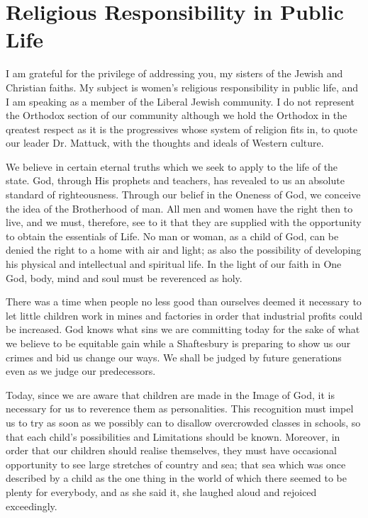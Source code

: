 \chapter{Religious Responsibility in Public Life}

I am grateful for the privilege of addressing you, my
sisters of the Jewish and Christian faiths. My subject is
women's religious responsibility in public life, and I am
speaking as a member of the Liberal Jewish community. I do
not represent the Orthodox section of our community
although we hold the Orthodox in the qreatest respect as it
is the progressives whose system of religion fits in, to
quote our leader Dr. Mattuck, with the thoughts and ideals
of Western culture.

We believe in certain eternal truths which we seek to
apply to the life of the state. God, through His prophets
and teachers, has revealed to us an absolute standard of
righteousness. Through our belief in the Oneness of God,
we conceive the idea of the Brotherhood of man. All men
and women have the right then to live, and we must, therefore,
see to it that they are supplied with the opportunity
to obtain the essentials of Life. No man or woman, as a
child of God, can be denied the right to a home with air
and light; as also the possibility of developing his
physical and intellectual and spiritual life. In the light
of our faith in One God, body, mind and soul must be
reverenced as holy.

There was a time when people no less good than
ourselves deemed it necessary to let little children work
in mines and factories in order that industrial profits
could be increased. God knows what sins we are committing
today for the sake of what we believe to be equitable gain
while a Shaftesbury is preparing to show us our crimes and
bid us change our ways. We shall be judged by future
generations even as we judge our predecessors.

Today, since we are aware that children are made in
the Image of God, it is necessary for us to reverence them
as personalities. This recognition must impel us to try as
soon as we possibly can to disallow overcrowded classes in
schools, so that each child's possibilities and Limitations
should be known. Moreover, in order that our children
should realise themselves, they must have occasional opportunity
to see large stretches of country and sea; that sea
which was once described by a child as the one thing in the
world of which there seemed to be plenty for everybody, and
as she said it, she laughed aloud and rejoiced exceedingly.

